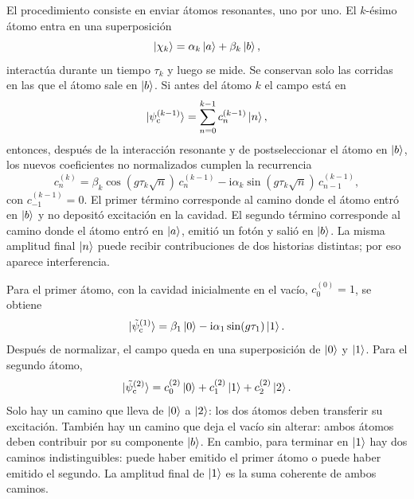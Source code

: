 \documentclass[11pt]{article}
\newcommand{\ii}{\mathrm{i}}
\begin{document}
El procedimiento consiste en enviar \'atomos resonantes, uno por uno. El
$k$-\'esimo \'atomo entra en una superposici\'on
\begin{equation}
  \ket{\chi_k}
  =
  \alpha_k\ket{a}
  +
  \beta_k\ket{b},
\end{equation}
interact\'ua durante un tiempo $\tau_k$ y luego se mide. Se conservan solo las
corridas en las que el \'atomo sale en $\ket{b}$. Si antes del \'atomo $k$ el
campo est\'a en
\begin{equation}
  \ket{\psi_{\mathrm{c}}^{(k-1)}}
  =
  \sum_{n=0}^{k-1}c_n^{(k-1)}\ket{n},
\end{equation}
entonces, despu\'es de la interacci\'on resonante y de postseleccionar el
\'atomo en $\ket{b}$, los nuevos coeficientes no normalizados cumplen la
recurrencia
\begin{equation}
  \boxed{
  c_n^{(k)}
  =
  \beta_k\cos(g\tau_k\sqrt{n})\,c_n^{(k-1)}
  -
  \ii\alpha_k\sin(g\tau_k\sqrt{n})\,c_{n-1}^{(k-1)},
  }
\end{equation}
con $c_{-1}^{(k-1)}=0$. El primer t\'ermino corresponde al camino donde el
\'atomo entr\'o en $\ket{b}$ y no deposit\'o excitaci\'on en la cavidad. El
segundo t\'ermino corresponde al camino donde el \'atomo entr\'o en $\ket{a}$,
emiti\'o un fot\'on y sali\'o en $\ket{b}$. La misma amplitud final $\ket{n}$
puede recibir contribuciones de dos historias distintas; por eso aparece
interferencia.

Para el primer \'atomo, con la cavidad inicialmente en el vac\'io,
$c_0^{(0)}=1$, se obtiene
\begin{equation}
  \ket{\tilde\psi_{\mathrm{c}}^{(1)}}
  =
  \beta_1\ket{0}
  -
  \ii\alpha_1\sin(g\tau_1)\ket{1}.
\end{equation}
Despu\'es de normalizar, el campo queda en una superposici\'on de $\ket{0}$ y
$\ket{1}$. Para el segundo \'atomo,
\begin{equation}
  \ket{\tilde\psi_{\mathrm{c}}^{(2)}}
  =
  c_0^{(2)}\ket{0}
  +
  c_1^{(2)}\ket{1}
  +
  c_2^{(2)}\ket{2}.
\end{equation}
Solo hay un camino que lleva de $\ket{0}$ a $\ket{2}$: los dos \'atomos deben
transferir su excitaci\'on. Tambi\'en hay un camino que deja el vac\'io sin
alterar: ambos \'atomos deben contribuir por su componente $\ket{b}$. En
cambio, para terminar en $\ket{1}$ hay dos caminos indistinguibles: puede haber
emitido el primer \'atomo o puede haber emitido el segundo. La amplitud final
de $\ket{1}$ es la suma coherente de ambos caminos.
\end{document}
